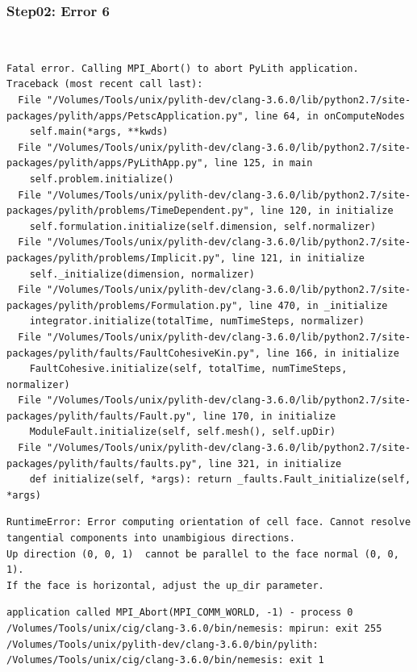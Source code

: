 \documentclass{beamer}
\begin{document}
\begin{frame}[fragile]
  \frametitle{Step02: Error 6}

\\
\begin{lstlisting}
Fatal error. Calling MPI_Abort() to abort PyLith application.
Traceback (most recent call last):
  File "/Volumes/Tools/unix/pylith-dev/clang-3.6.0/lib/python2.7/site-packages/pylith/apps/PetscApplication.py", line 64, in onComputeNodes
    self.main(*args, **kwds)
  File "/Volumes/Tools/unix/pylith-dev/clang-3.6.0/lib/python2.7/site-packages/pylith/apps/PyLithApp.py", line 125, in main
    self.problem.initialize()
  File "/Volumes/Tools/unix/pylith-dev/clang-3.6.0/lib/python2.7/site-packages/pylith/problems/TimeDependent.py", line 120, in initialize
    self.formulation.initialize(self.dimension, self.normalizer)
  File "/Volumes/Tools/unix/pylith-dev/clang-3.6.0/lib/python2.7/site-packages/pylith/problems/Implicit.py", line 121, in initialize
    self._initialize(dimension, normalizer)
  File "/Volumes/Tools/unix/pylith-dev/clang-3.6.0/lib/python2.7/site-packages/pylith/problems/Formulation.py", line 470, in _initialize
    integrator.initialize(totalTime, numTimeSteps, normalizer)
  File "/Volumes/Tools/unix/pylith-dev/clang-3.6.0/lib/python2.7/site-packages/pylith/faults/FaultCohesiveKin.py", line 166, in initialize
    FaultCohesive.initialize(self, totalTime, numTimeSteps, normalizer)
  File "/Volumes/Tools/unix/pylith-dev/clang-3.6.0/lib/python2.7/site-packages/pylith/faults/Fault.py", line 170, in initialize
    ModuleFault.initialize(self, self.mesh(), self.upDir)
  File "/Volumes/Tools/unix/pylith-dev/clang-3.6.0/lib/python2.7/site-packages/pylith/faults/faults.py", line 321, in initialize
    def initialize(self, *args): return _faults.Fault_initialize(self, *args)
\end{lstlisting}
\begin{lstlisting}
RuntimeError: Error computing orientation of cell face. Cannot resolve tangential components into unambigious directions.
Up direction (0, 0, 1)  cannot be parallel to the face normal (0, 0, 1).
If the face is horizontal, adjust the up_dir parameter.
\end{lstlisting}
\begin{lstlisting}
application called MPI_Abort(MPI_COMM_WORLD, -1) - process 0
/Volumes/Tools/unix/cig/clang-3.6.0/bin/nemesis: mpirun: exit 255
/Volumes/Tools/unix/pylith-dev/clang-3.6.0/bin/pylith: /Volumes/Tools/unix/cig/clang-3.6.0/bin/nemesis: exit 1
\end{lstlisting}

\end{frame}
\end{document}
